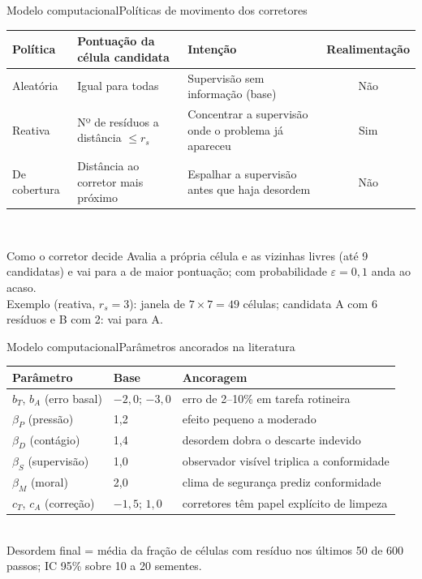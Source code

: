 \documentclass[aspectratio=169, 10pt]{beamer}
\begin{document}
\begin{frame}{Modelo computacional}{Políticas de movimento dos corretores}
  \centering\small
  \begin{tabular}{@{}lp{4.6cm}p{4.6cm}c@{}}
    \toprule
    Política & Pontuação da célula candidata & Intenção & Realimentação \\
    \midrule
    Aleatória & Igual para todas & Supervisão sem informação (base) & Não \\
    Reativa & Nº de resíduos a distância $\le r_s$ & Concentrar a supervisão onde o problema já apareceu & Sim \\
    De cobertura & Distância ao corretor mais próximo & Espalhar a supervisão antes que haja desordem & Não \\
    \bottomrule
  \end{tabular}\\[8pt]
  \begin{block}{Como o corretor decide}
    Avalia a própria célula e as vizinhas livres (até 9 candidatas) e vai para a de maior pontuação; com probabilidade $\varepsilon=0{,}1$ anda ao acaso.\\
    Exemplo (reativa, $r_s=3$): janela de $7\times7=49$ células; candidata A com 6 resíduos e B com 2: vai para A.
  \end{block}
\end{frame}

\begin{frame}{Modelo computacional}{Parâmetros ancorados na literatura}
  \centering\small
  \begin{tabular}{@{}llp{8.2cm}@{}}
    \toprule
    Parâmetro & Base & Ancoragem \\
    \midrule
    $b_T$, $b_A$ (erro basal) & $-2{,}0$; $-3{,}0$ & erro de 2--10\% em tarefa rotineira \citep{kirwan1994} \\
    $\beta_P$ (pressão) & 1,2 & efeito pequeno a moderado \citep{szalma2008} \\
    $\beta_D$ (contágio) & 1,4 & desordem dobra o descarte indevido \citep{keizer2008} \\
    $\beta_S$ (supervisão) & 1,0 & observador visível triplica a conformidade \citep{srigley2014} \\
    $\beta_M$ (moral) & 2,0 & clima de segurança prediz conformidade \citep{christian2009} \\
    $c_T$, $c_A$ (correção) & $-1{,}5$; $1{,}0$ & corretores têm papel explícito de limpeza \citep{rangoni2017} \\
    \bottomrule
  \end{tabular}\\[8pt]
  Desordem final = média da fração de células com resíduo nos últimos 50 de 600 passos; IC 95\% sobre 10 a 20 sementes.
\end{frame}
\end{document}
